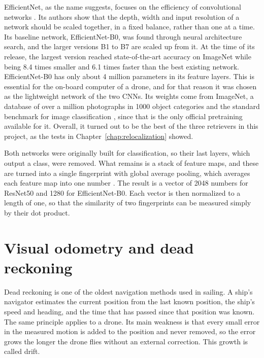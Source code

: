 \documentclass[english, Lau, oneside]{sapthesis}%
\begin{document}
EfficientNet, as the name suggests, focuses on the efficiency of convolutional networks \citep{tan2019efficientnet}. Its authors show that the depth, width and input resolution of a network should be scaled together, in a fixed balance, rather than one at a time. Its baseline network, EfficientNet-B0, was found through neural architecture search, and the larger versions B1 to B7 are scaled up from it. At the time of its release, the largest version reached state-of-the-art accuracy on ImageNet while being 8.4 times smaller and 6.1 times faster than the best existing network. EfficientNet-B0 has only about 4 million parameters in its feature layers. This is essential for the on-board computer of a drone, and for that reason it was chosen as the lightweight network of the two CNNs. Its weights come from ImageNet, a database of over a million photographs in 1000 object categories and the standard benchmark for image classification \citep{russakovsky2015imagenet}, since that is the only official pretraining available for it. Overall, it turned out to be the best of the three retrievers in this project, as the tests in Chapter~\ref{chap:relocalization} showed.

Both networks were originally built for classification, so their last layers, which output a class, were removed. What remains is a stack of feature maps, and these are turned into a single fingerprint with global average pooling, which averages each feature map into one number \citep{lin2014nin}. The result is a vector of 2048 numbers for ResNet50 and 1280 for EfficientNet-B0. Each vector is then normalized to a length of one, so that the similarity of two fingerprints can be measured simply by their dot product.

\section{Visual odometry and dead reckoning}
\label{sec:bg-vo}
Dead reckoning is one of the oldest navigation methods used in sailing. A ship's navigator estimates the current position from the last known position, the ship's speed and heading, and the time that has passed since that position was known. The same principle applies to a drone. Its main weakness is that every small error in the measured motion is added to the position and never removed, so the error grows the longer the drone flies without an external correction. This growth is called drift.
\end{document}
